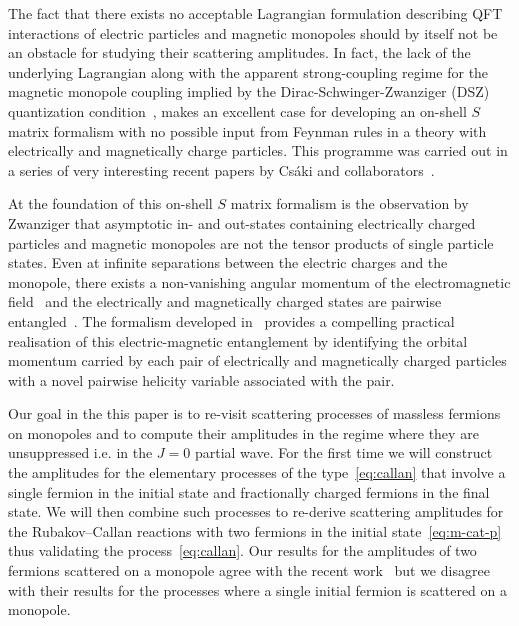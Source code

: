 \documentclass[a4paper,11pt]{article}
\begin{document}
\medskip

The fact that there exists no acceptable Lagrangian formulation describing QFT interactions of electric particles and magnetic monopoles should by itself not be an  obstacle for studying their scattering amplitudes.
In fact, the lack of the underlying Lagrangian along with the apparent strong-coupling regime for the magnetic monopole coupling implied by the  
Dirac-Schwinger-Zwanziger (DSZ) quantization condition~\cite{Dirac:1931kp,Schwinger:1975ww,Zwanziger:1968rs},
makes an excellent case for developing an on-shell $S$ matrix formalism with no possible input from Feynman rules in a theory with electrically and magnetically charge particles.
This programme was carried out in a series of very interesting recent papers by Cs\'aki and collaborators~\cite{Csaki:2020inw,Csaki:2020yei,Csaki:2022tvb}.

At the foundation of this on-shell $S$ matrix formalism is the observation by Zwanziger 
 that asymptotic in- and out-states containing electrically charged particles and magnetic monopoles are not the tensor products of single particle states. Even at infinite separations between the electric charges and the monopole, there exists a non-vanishing angular momentum of the electromagnetic field~\cite{Thomson1904} and the electrically and magnetically charged states are pairwise entangled~\cite{Zwanziger:1972sx}. The  formalism developed in~\cite{Csaki:2020inw,Csaki:2020yei} provides a compelling practical realisation of this electric-magnetic entanglement by identifying the orbital momentum 
 carried by each pair of electrically and magnetically charged particles with a novel pairwise helicity variable associated with the pair.
 
 \medskip
 
Our goal in the this paper is to re-visit scattering processes of massless fermions on monopoles and to compute their amplitudes
in the regime where they are unsuppressed i.e. in the $J=0$ partial wave.
For the first time we will construct the amplitudes for the elementary processes of the type~\eqref{eq:callan} that involve a single fermion in the initial state and
fractionally charged fermions in the final state. We will then combine such processes to re-derive scattering amplitudes for the Rubakov--Callan
reactions with two fermions in the initial state~\eqref{eq:m-cat-p} thus validating the process~\eqref{eq:callan}.
Our results for the amplitudes of two fermions scattered on a monopole agree with the recent work~\cite{Csaki:2022qtz} but we disagree with their results for the processes 
where a single initial fermion is scattered on a monopole.
\end{document}
